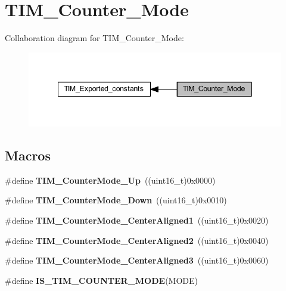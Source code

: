 \hypertarget{group___t_i_m___counter___mode}{}\section{T\+I\+M\+\_\+\+Counter\+\_\+\+Mode}
\label{group___t_i_m___counter___mode}
Collaboration diagram for T\+I\+M\+\_\+\+Counter\+\_\+\+Mode\+:\nopagebreak
\begin{figure}[H]
\begin{center}
\leavevmode
\includegraphics[width=342pt]{group___t_i_m___counter___mode}
\end{center}
\end{figure}
\subsection*{Macros}
\begin{DoxyCompactItemize}
\item 
\mbox{\label{group___t_i_m___counter___mode_gaf4cd3ce74af3122507b77c8f6e79c832}} 
\#define {\bfseries T\+I\+M\+\_\+\+Counter\+Mode\+\_\+\+Up}~((uint16\+\_\+t)0x0000)
\item 
\mbox{\label{group___t_i_m___counter___mode_gadd7c4200d185bdcd9e64ae80e6b200b0}} 
\#define {\bfseries T\+I\+M\+\_\+\+Counter\+Mode\+\_\+\+Down}~((uint16\+\_\+t)0x0010)
\item 
\mbox{\label{group___t_i_m___counter___mode_gac07392e9637f8a0d115d4ba9a002ae93}} 
\#define {\bfseries T\+I\+M\+\_\+\+Counter\+Mode\+\_\+\+Center\+Aligned1}~((uint16\+\_\+t)0x0020)
\item 
\mbox{\label{group___t_i_m___counter___mode_ga3793122e4c123a99e46fc2f04acea0d4}} 
\#define {\bfseries T\+I\+M\+\_\+\+Counter\+Mode\+\_\+\+Center\+Aligned2}~((uint16\+\_\+t)0x0040)
\item 
\mbox{\label{group___t_i_m___counter___mode_ga65d9bc01ffa287cd7cf200d08c20a1ce}} 
\#define {\bfseries T\+I\+M\+\_\+\+Counter\+Mode\+\_\+\+Center\+Aligned3}~((uint16\+\_\+t)0x0060)
\item 
\#define {\bfseries I\+S\+\_\+\+T\+I\+M\+\_\+\+C\+O\+U\+N\+T\+E\+R\+\_\+\+M\+O\+DE}(M\+O\+DE)
\end{DoxyCompactItemize}


